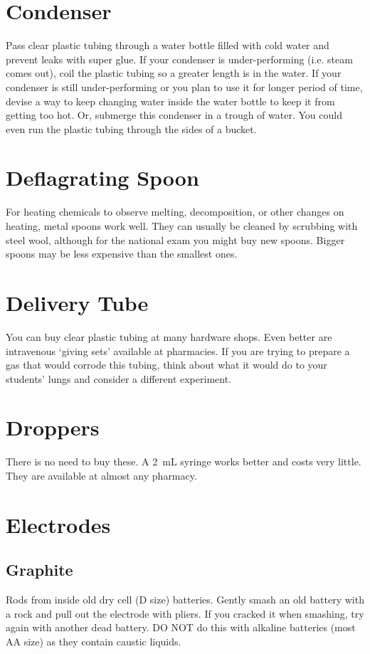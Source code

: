 \section{Condenser}
\label{sec:condenser}
Pass clear plastic tubing through a water bottle filled 
with cold water and prevent leaks with super glue. 
If your condenser is under-performing (i.e. 
steam comes out), 
coil the plastic tubing so a greater length is in the water. 
If your condenser is still under-performing 
or you plan to use it for longer period of time, 
devise a way to keep changing water inside the water bottle 
to keep it from getting too hot. 
Or, 
submerge this condenser in a trough of water. 
You could even run the plastic tubing through the sides of a bucket.

\section{Deflagrating Spoon}
\label{sec:deflagratingspoon}
For heating chemicals to observe melting, 
decomposition, 
or other changes on heating, 
metal spoons work well. 
They can usually be cleaned by scrubbing with steel wool, 
although for the national exam you might buy new spoons. 
Bigger spoons may be less expensive than the smallest ones.

\section{Delivery Tube}
\label{sec:delivery-tube}
You can buy clear plastic tubing at many hardware shops. 
Even better are intravenous `giving sets' available at pharmacies. 
If you are trying to prepare a gas that would corrode this tubing, 
think about what it would do to your students' lungs 
and consider a different experiment.

\section{Droppers}
\label{sec:droppers}
There is no need to buy these. 
A 2~mL syringe works better and costs very little. 
They are available at almost any pharmacy.

\section{Electrodes}
\label{sec:electrodes}
\subsection{Graphite}
Rods from inside old dry cell (D size) batteries. Gently smash an old battery with a rock and pull out the electrode with pliers. If you cracked it when smashing, try again with another dead battery. DO NOT do this with alkaline batteries (most AA size) as they contain caustic liquids.
